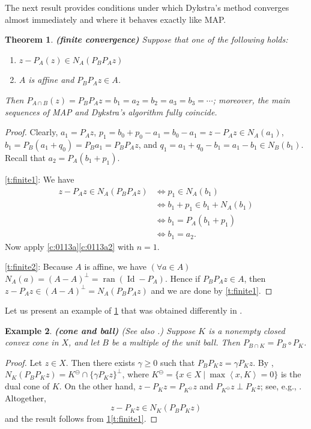 \documentclass[12pt]{article}
\newcommand{\menge}[2]{\big\{{#1}~\big |~{#2}\big\}}
\newcommand{\scal}[2]{\left\langle{#1},{#2}  \right\rangle}
\newcommand{\ran}{\ensuremath{\operatorname{ran}}}
\newcommand{\Id}{\ensuremath{\operatorname{Id}}}
\newtheorem{theorem}{Theorem}[section]
\newtheorem{example}[theorem]{Example}
\providecommand{\ran}{\operatorname{ran}}
\providecommand{\Id}{\operatorname{{ Id}}}
\providecommand{\ran}{\operatorname{ran}}
\providecommand{\Id}{\operatorname{Id}}
\begin{document}
The next result provides conditions under which Dykstra's method 
converges almost immediately and where it behaves exactly like MAP. 

\begin{theorem} {\rm\bf (finite convergence)}
\label{t:finite}
Suppose that one of the following holds:
\begin{enumerate}
\item 
\label{t:finite1}
$z-P_A(z)\in N_A(P_BP_Az)$
\item 
\label{t:finite2}
$A$ is affine and $P_BP_Az\in A$.
\end{enumerate}
Then 
$P_{A\cap B}(z)=P_BP_Az = b_1=a_2=b_2=a_3=b_3=\cdots$;
moreover, the main sequences of MAP and Dykstra's algorithm fully coincide. 
\end{theorem}
\begin{proof}
Clearly, $a_1=P_Az$, 
$p_1 = b_0+p_0-a_1 = b_0-a_1 = z-P_Az\in N_A(a_1)$,
$b_1 = P_B(a_1+q_0)=P_Ba_1 = P_BP_Az$, and
$q_1 = a_1+q_0-b_1 = a_1-b_1 \in N_B(b_1)$.
Recall that $a_2=P_A(b_1+p_1)$.

\cref{t:finite1}:
We have 
\begin{subequations}
\begin{align}
z-P_Az\in N_A(P_BP_Az)
&\Leftrightarrow 
p_1 \in N_A(b_1)\\
&\Leftrightarrow 
b_1+p_1\in b_1+N_A(b_1)\\
&\Leftrightarrow 
b_1 = P_A(b_1+p_1)\\
&\Leftrightarrow 
b_1 = a_2.
\end{align}
\end{subequations}
Now apply \cref{c:0113a}\cref{c:0113a2} with $n=1$.

\cref{t:finite2}:
Because $A$ is affine, we have 
$(\forall a\in A)$ $N_A(a) = (A-A)^\perp = \ran(\Id-P_A)$.
Hence 
if $P_BP_Az\in A$, then 
$z-P_Az \in (A-A)^\perp = N_A(P_BP_Az)$
and we are done by \cref{t:finite1}.
\end{proof}

Let us present an example of \cref{t:finite} that was obtained differently 
in \cite{Minh}. 

\begin{example} 
{\rm\bf (cone and ball)}
 (See also \cite[Corollary~7.3]{Minh}.)
\label{ex:Minh}
Suppose $K$ is a nonempty closed convex cone in $X$,
and let $B$ be a multiple of the unit ball.
Then $P_{B\cap K} = P_B\circ P_K$.
\end{example}
\begin{proof}
Let $z\in X$. 
Then there exists $\gamma\geq 0$ such that
$P_BP_Kz = \gamma P_Kz$.
By \cite[Example~6~40]{BC2017},
$N_K(P_BP_Kz) = K^\ominus \cap \{\gamma P_Kz\}^\perp$, 
where $K^\ominus = \menge{x\in X}{\max\scal{x}{K}=0}$ is the dual cone of $K$. 
On the other hand,
$z-P_Kz = P_{K^\ominus}z$ and
$P_{K^\ominus}z \perp P_Kz$; see, e.g., \cite[Theorem~6.30]{BC2017}.
Altogether,
\begin{equation}
 z-P_Kz \in N_K(P_BP_Kz)
\end{equation}
and the result follows from \cref{t:finite}\cref{t:finite1}.
\end{proof}
\end{document}
